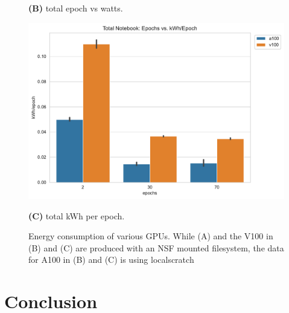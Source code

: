 \documentclass[utf8]{FrontiersinVancouver} %
\begin{document}
\begin{figure}[htb]
\begin{center}
        {\bf (B)} total epoch vs watts.

         \includegraphics[height=0.29\textheight]{images/total_kWh_per_epoch.pdf}

         {\bf (C)}  total kWh per epoch.

  \end{center}

  \caption{Energy consumption of various GPUs. While (A) and the V100
    in (B) and (C) are produced with an NSF mounted filesystem, the
    data for A100 in (B) and (C) is using localscratch} 
  \label{fig:energy-graphs-compare}
\end{figure}



\section{Conclusion}
\end{document}

